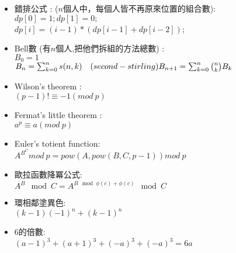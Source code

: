 \begin{itemize}
  \item 錯排公式 :  ($n$個人中，每個人皆不再原來位置的組合數): \\
    $dp[0]=1;dp[1]=0;$\\
    $dp[i]=(i-1)*(dp[i-1]+dp[i-2])$;
  \item Bell數 (有$n$個人,把他們拆組的方法總數) : \\
    $B_0= 1$\\
    $B_n= \sum_{k=0}^{n} s(n,k)\quad (second-stirling)\\
    B_{n+1}= \sum_{k=0}^{n}{n \choose k} B_k$
  \item Wilson's theorem :\\
    $(p-1)! \equiv -1 (mod \ p)$
  \item Fermat's little theorem :\\
    $a^p \equiv a (mod \ p)$
  \item Euler's totient function:\\
    $ A ^ {B ^ C} mod \ p = pow(A,pow(B,C,p-1)) mod \ p$
  \item 歐拉函數降冪公式:\\
    $A^B \mod C=A^{B \mod \phi(c) + \phi(c)}\mod C$
  \item 環相鄰塗異色:\\
      $(k-1)(-1)^n+(k-1)^n$
  \item 6的倍數: \\
   $(a-1)^3 + (a+1)^3 + (-a)^3 + (-a)^3 = 6a$

\end{itemize}
